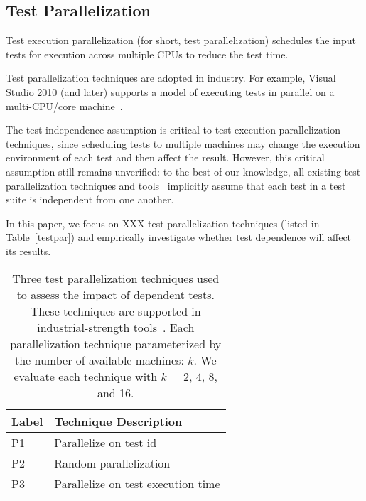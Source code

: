 \subsection{Test Parallelization}
\label{sec:backgroundpar}

Test execution parallelization (for short, test parallelization)
schedules the input tests for execution across
multiple CPUs to reduce the test time.

Test parallelization techniques are adopted in
industry. For example, Visual Studio 2010 (and later)
supports a model of executing tests in parallel on a multi-CPU/core machine~\cite{}.

The test independence assumption is critical to test
execution parallelization techniques, since scheduling tests
to multiple machines may change the execution environment
of each test and then affect the result. However, this critical
assumption still remains unverified: to the best of our
knowledge, all existing test parallelization techniques and
tools~\cite{} implicitly assume that each test in a test
suite is independent from one another.

In this paper, we focus on XXX test parallelization techniques
(listed in Table~\ref{testpar}) and empirically investigate whether test dependence will affect its
results.

\begin{table}
\centering
\setlength{\tabcolsep}{0.25\tabcolsep}
\begin{tabular}{|l|l|}
\hline
\textbf{Label} & \textbf{Technique Description} \\
\hline
P1 & Parallelize on test id\\
P2 & Random parallelization\\
P3 & Parallelize on test execution time\\
\hline
\end{tabular}
\caption{Three test parallelization techniques used
to assess the impact of dependent tests. These
techniques are supported in industrial-strength
tools~\cite{}. 
Each parallelization technique parameterized
by the number of available machines: $k$. We evaluate
each technique with $k$ = 2, 4, 8, and 16.
}
\label{tab:testpar}
\end{table}
